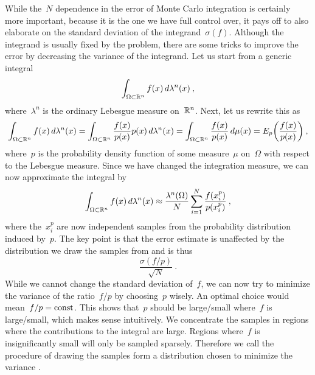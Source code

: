 While the~$N$ dependence in the error of Monte Carlo integration is certainly
more important, because it is the one we have full control over, it pays off to
also elaborate on the standard deviation of the integrand~$\sigma(f)$. Although
the integrand is usually fixed by the problem, there are some tricks to improve
the error by decreasing the variance of the integrand. Let us start from a
generic integral
%
\begin{equation}
  \int_{\Omega \subset \mathbb{R}^n} f(x) \,d\lambda^n(x)\:,
\end{equation}
%
where~$\lambda^n$ is the ordinary Lebesgue measure on~$\mathbb{R}^n$. Next, let us
rewrite this as
%
\begin{equation}
  \int_{\Omega \subset \mathbb{R}^n} f(x) \,d\lambda^n(x) =
    \int_{\Omega \subset \mathbb{R}^n} \frac{f(x)}{p(x)} p(x) \,d\lambda^n(x) =
    \int_{\Omega \subset \mathbb{R}^n} \frac{f(x)}{p(x)} \,d\mu(x) =
    E_{p}\biggl(\frac{f(x)}{p(x)}\biggr) \:,
\end{equation}
%
where~$p$ is the probability density function of some measure~$\mu$ on~$\Omega$
with respect to the Lebesgue measure. Since we have changed the integration
measure, we can now approximate the integral by
%
\begin{equation}
  \int_{\Omega \subset \mathbb{R}^n} f(x) \,d\lambda^n(x) \approx
  \frac{\lambda^n(\Omega)}{N} \sum_{i=1}^N \frac{f(x_i^p)}{p(x_i^p)}\:,
\end{equation}
%
where the~$x_i^p$ are now independent samples from the probability distribution
induced by~$p$. The key point is that the error estimate is unaffected by the
distribution we draw the samples from and is thus
%
\begin{equation}
  \frac{\sigma(f/p)}{\sqrt{N}} \:.
\end{equation}
%
While we cannot change the standard deviation of~$f$, we can now try to
minimize the variance of the ratio~$f/p$ by choosing~$p$ wisely. An optimal
choice would mean~$f/p = \mathrm{const}$. This shows that~$p$ should be large/small
where~$f$ is large/small, which makes sense intuitively. We concentrate the
samples in regions where the contributions to the integral are large. Regions
where~$f$ is insignificantly small will only be sampled sparsely. Therefore we
call the procedure of drawing the samples form a distribution chosen to minimize
the variance .

